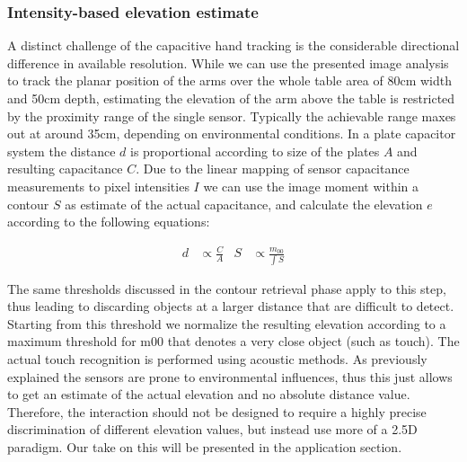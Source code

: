 \subsubsection{Intensity-based elevation estimate}
A distinct challenge of the capacitive hand tracking is the considerable directional difference in available resolution. While we can use the presented image analysis to track the planar position of the arms over the whole table area of 80cm width and 50cm depth, estimating the elevation of the arm above the table is restricted by the proximity range of the single sensor. Typically the achievable range maxes out at around 35cm, depending on environmental conditions. In a plate capacitor system the distance $d$ is proportional according to size of the plates $A$ and resulting capacitance $C$. Due to the linear mapping of sensor capacitance measurements to pixel intensities $I$ we can use the image moment within a contour $S$ as estimate of the actual capacitance, and calculate the elevation $e$ according to the following equations:

\begin{align}
d&\propto{\tfrac{C}{A}} & S&\propto{\tfrac{m_{00}}{\int{S}}}
\end{align}

The same thresholds discussed in the contour retrieval phase apply to this step, thus leading to discarding objects at a larger distance that are difficult to detect. Starting from this threshold we normalize the resulting elevation according to a maximum threshold for m00 that denotes a very close object (such as touch). The actual touch recognition is performed using acoustic methods. 
As previously explained the sensors are prone to environmental influences, thus this just allows to get an estimate of the actual elevation and no absolute distance value. Therefore, the interaction should not be designed to require a highly precise discrimination of different elevation values, but instead use more of a 2.5D paradigm. Our take on this will be presented in the application section.